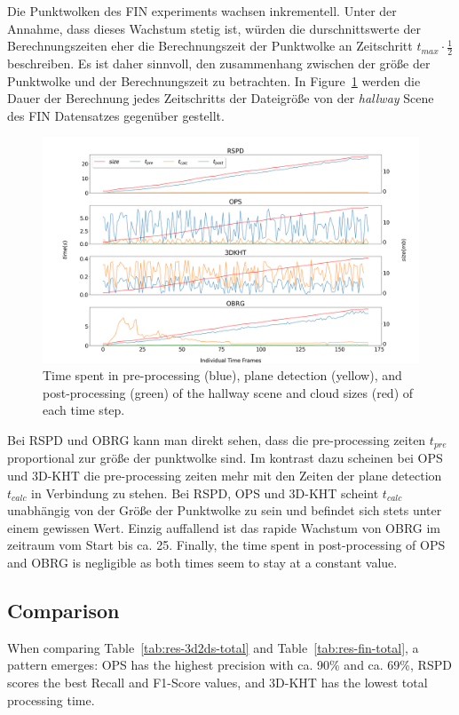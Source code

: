 \documentclass[main.tex]{subfiles}
\begin{document}
Die Punktwolken des FIN experiments wachsen inkrementell. Unter der Annahme, dass dieses Wachstum stetig ist,
würden die durschnittswerte der Berechnungszeiten eher die Berechnungszeit der Punktwolke an Zeitschritt $t_{max} \cdot \frac{1}{2}$ beschreiben.
Es ist daher sinnvoll, den zusammenhang zwischen der größe der Punktwolke und der Berechnungszeit zu betrachten.
In Figure~\ref{fig:dynhallway} werden die Dauer der Berechnung jedes Zeitschritts der Dateigröße von der
\textit{hallway} Scene des FIN Datensatzes gegenüber gestellt.

\begin{figure}[H]
    \centering
    \includegraphics[width=\textwidth]{images/dyn_time-hallway.png}
    \caption[Time Results Hallway]{Time spent in pre-processing (blue), plane detection (yellow), and post-processing
        (green) of the hallway scene and cloud sizes (red) of each time step.}
    \label{fig:dynhallway}
\end{figure}

Bei RSPD und OBRG kann man direkt sehen, dass die pre-processing zeiten $t_{pre}$ proportional zur größe der punktwolke
sind. Im kontrast dazu scheinen bei OPS und 3D-KHT die pre-processing zeiten mehr mit den Zeiten der plane detection
$t_{calc}$ in Verbindung zu stehen. Bei RSPD, OPS und 3D-KHT scheint $t_{calc}$ unabhängig von der Größe der Punktwolke
zu sein und befindet sich stets unter einem gewissen Wert. Einzig auffallend ist das rapide Wachstum von OBRG im zeitraum
vom Start bis ca. 25.
Finally, the time spent in post-processing of OPS and OBRG is negligible as both times seem to stay at a constant
value.

\subsection{Comparison}
When comparing Table~\ref{tab:res-3d2ds-total} and Table~\ref{tab:res-fin-total}, a pattern emerges:
OPS has the highest precision with ca. 90\% and ca. 69\%, RSPD scores the best Recall and F1-Score values, and 3D-KHT has the lowest total
processing time.
\end{document}
